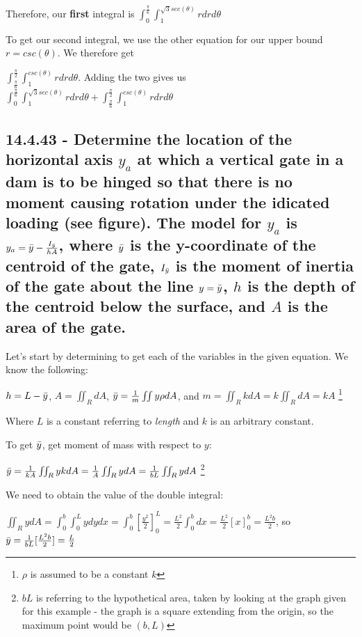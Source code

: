 \documentclass{article}
\begin{document}
\par\noindent\Large Therefore, our \textbf{first} integral is $\int_{0}^{\frac{\pi}{6}}\int_{1}^{\sqrt{3}sec(\theta)}rdrd\theta$\vspace{0.25cm}

\par\noindent\large To get our second integral, we use the other equation for our upper bound $r = csc(\theta)$.  We therefore get
\par\noindent\Large $\int_{\frac{\pi}{6}}^{\frac{\pi}{2}}\int_{1}^{csc(\theta)}rdrd\theta$.  Adding the two gives us $\int_{0}^{\frac{\pi}{6}}\int_{1}^{\sqrt{3}sec(\theta)}rdrd\theta + \int_{\frac{\pi}{6}}^{\frac{\pi}{2}}\int_{1}^{csc(\theta)}rdrd\theta$

\subsection{14.4.43 - Determine the location of the horizontal axis $y_{a}$ at which a vertical gate in a dam is to be hinged so that there is no moment causing rotation under the idicated loading (see figure).  The model for $y_{a}$ is $y_{a} = \Bar{y} - \frac{I_{\Bar{y}}}{hA}$, where $\Bar{y}$ is the y-coordinate of the centroid of the gate, $I_{\Bar{y}}$ is the moment of inertia of the gate about the line $y = \Bar{y}$, $h$ is the depth of the centroid below the surface, and $A$ is the area of the gate.}

\par\noindent\large Let's start by determining to get each of the variables in the given equation.  We know the following:
\par\noindent\Large $h = L - \Bar{y}$, $A = \iint_{R}dA$, $\Bar{y} = \frac{1}{m}\iint y\rho dA$, and $m = \iint_{R}kdA = k\iint_{R}dA = kA$  \footnote{$\rho$ is assumed to be a constant $k$}
\par\noindent\large Where $L$ is a constant referring to \textit{length} and $k$ is an arbitrary constant.\vspace{0.25cm}

\par\noindent\large To get $\Bar{y}$, get moment of mass with respect to $y$: \par\noindent\Large $\Bar{y} = \frac{1}{kA}\iint_{R}ykdA = \frac{1}{A}\iint_{R}ydA = \frac{1}{bL}\iint_{R}ydA$  \footnote{$bL$ is referring to the hypothetical area, taken by looking at the graph given for this example - the graph is a square extending from the origin, so the maximum point would be $(b, L)$}
\par\noindent\large We need to obtain the value of the double integral:
\par\noindent\Large $\iint_{R}ydA = \int_{0}^{b}\int_{0}^{L}ydydx = \int_{0}^{b}[\frac{y^{2}}{2}]_{0}^{L} = \frac{L^{2}}{2}\int_{0}^{b}dx = \frac{L^{2}}{2}[x]_{0}^{b} = \frac{L^{2}b}{2}$, so $\Bar{y} = \frac{1}{bL}[\frac{L^{2}b}{2}] = \frac{L}{2}$\vspace{0.25cm}
\end{document}
